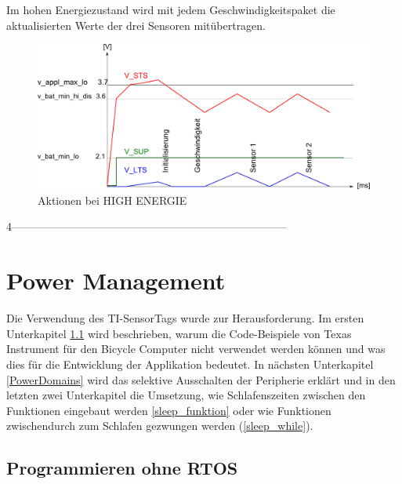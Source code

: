 Im hohen Energiezustand wird mit jedem Geschwindigkeitspaket die aktualisierten Werte der drei Sensoren mitübertragen. 

\begin{figure}[ht]
  \includegraphics[width=1.0\textwidth]{3Vorgehen/imag/HIGH_ENERGY.png}
  \caption{Aktionen bei HIGH ENERGIE}
  \label{HIGH_ENER}
\end{figure}







 4---------------------------------------------------------------------------
\section{Power Management}
\label{powerOptimierung}

Die Verwendung des TI-SensorTags wurde zur Herausforderung. Im ersten Unterkapitel \ref{keinROTS} wird beschrieben, warum die Code-Beispiele von Texas Instrument für den Bicycle Computer nicht verwendet werden können und was dies für die Entwicklung der Applikation bedeutet. In nächsten Unterkapitel \ref{PowerDomains} wird das selektive Ausschalten der Peripherie erklärt und in den letzten zwei Unterkapitel die Umsetzung, wie Schlafenszeiten zwischen den Funktionen eingebaut werden \ref{sleep_funktion} oder wie Funktionen zwischendurch zum Schlafen gezwungen werden (\ref{sleep_while}).



\subsection{Programmieren ohne RTOS}
\label{keinROTS}

